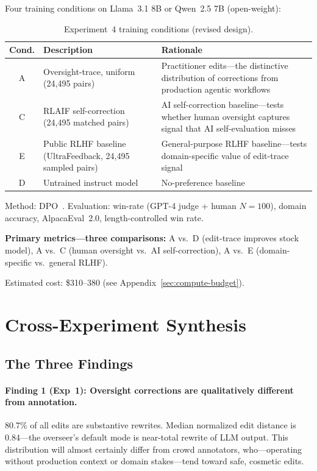 \documentclass[11pt]{article}
\begin{document}
Four training conditions on Llama~3.1 8B or Qwen~2.5 7B (open-weight):

\begin{table}[h]
\centering
\caption{Experiment~4 training conditions (revised design).}
\label{tab:exp4-conditions}
\begin{tabular}{@{}clp{8cm}@{}}
\toprule
\textbf{Cond.} & \textbf{Description} & \textbf{Rationale} \\
\midrule
A & Oversight-trace, uniform (24{,}495 pairs) & Practitioner edits---the distinctive distribution of corrections from production agentic workflows \\
C & RLAIF self-correction (24{,}495 matched pairs) & AI self-correction baseline---tests whether human oversight captures signal that AI self-evaluation misses \\
E & Public RLHF baseline (UltraFeedback, 24{,}495 sampled pairs) & General-purpose RLHF baseline---tests domain-specific value of edit-trace signal \\
D & Untrained instruct model & No-preference baseline \\
\bottomrule
\end{tabular}
\end{table}

Method: DPO~\citep{rafailov2023direct}.
Evaluation: win-rate (GPT-4 judge + human $N=100$), domain accuracy, AlpacaEval~2.0, length-controlled win rate.

\textbf{Primary metrics---three comparisons:} A vs.\ D (edit-trace improves stock model), A vs.\ C (human oversight vs.\ AI self-correction), A vs.\ E (domain-specific vs.\ general RLHF).

Estimated cost: \$310--380 (see Appendix~\ref{sec:compute-budget}).


\section{Cross-Experiment Synthesis}
\label{sec:synthesis}

\subsection{The Three Findings}

\paragraph{Finding 1 (Exp~1): Oversight corrections are qualitatively different from annotation.}
80.7\% of all edits are substantive rewrites.
Median normalized edit distance is 0.84---the overseer's default mode is near-total rewrite of LLM output.
This distribution will almost certainly differ from crowd annotators, who---operating without production context or domain stakes---tend toward safe, cosmetic edits.
\end{document}
